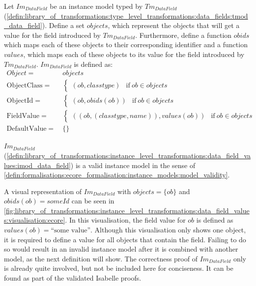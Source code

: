 \begin{defin}
\label{defin:library_of_transformations:instance_level_transformations:data_field_values:imod_data_field}
Let $Im_{DataField}$ be an instance model typed by $Tm_{DataField}$ (\cref{defin:library_of_transformations:type_level_transformations:data_fields:tmod_data_field}). Define a set $objects$, which represent the objects that will get a value for the field introduced by $Tm_{DataField}$. Furthermore, define a function $obids$ which maps each of these objects to their corresponding identifier and a function $values$, which maps each of these objects to its value for the field introduced by $Tm_{DataField}$. $Im_{DataField}$ is defined as:
\begin{align*}
Object =\ &objects \\
\mathrm{ObjectClass} =\ & \begin{cases}
    (ob, classtype) & \mathrm{if }\ ob \in objects
\end{cases}\\
\mathrm{ObjectId} =\ & \begin{cases}
    (ob, obids(ob)) & \mathrm{if }\ ob \in objects
\end{cases}\\
\mathrm{FieldValue} =\ & \begin{cases}
    ((ob, (classtype, name)), values(ob)) & \mathrm{if }\ ob \in objects
\end{cases} \\
\mathrm{DefaultValue} =\ & \{\}
\end{align*}
\end{defin}

\begin{thm}
\label{defin:library_of_transformations:instance_level_transformations:data_field_values:imod_data_field_correct}
$Im_{DataField}$ (\cref{defin:library_of_transformations:instance_level_transformations:data_field_values:imod_data_field}) is a valid instance model in the sense of \cref{defin:formalisations:ecore_formalisation:instance_models:model_validity}.
\end{thm}

A visual representation of $Im_{DataField}$ with $objects = \{ob\}$ and $obids(ob) = someId$ can be seen in \cref{fig:library_of_transformations:instance_level_transformations:data_field_values:visualisation:ecore}. In this visualisation, the field value for $ob$ is defined as $values(ob) = \text{``some value''}$. Although this visualisation only shows one object, it is required to define a value for all objects that contain the field. Failing to do so would result in an invalid instance model after it is combined with another model, as the next definition will show. The correctness proof of $Im_{DataField}$ only is already quite involved, but not be included here for conciseness. It can be found as part of the validated Isabelle proofs.

